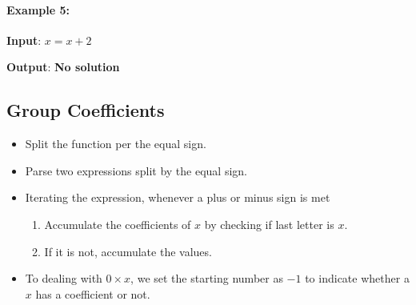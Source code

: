 \paragraph{Example 5:}

\begin{flushleft}
\textbf{Input}: $x=x+2$

\textbf{Output}: \textbf{No solution}

\end{flushleft}

\subsection{Group Coefficients}
\begin{itemize}
\item Split the function per the equal sign.
\item Parse two expressions split by the equal sign.
\item Iterating the expression, whenever a plus or minus sign is met
\begin{enumerate}
\item Accumulate the coefficients of $x$ by checking if last letter is $x$.
\item If it is not, accumulate the values.
\end{enumerate}
\item To dealing with $0\times x$, we set the starting number as $-1$ to indicate whether a $x$ has a coefficient or not.
\end{itemize}